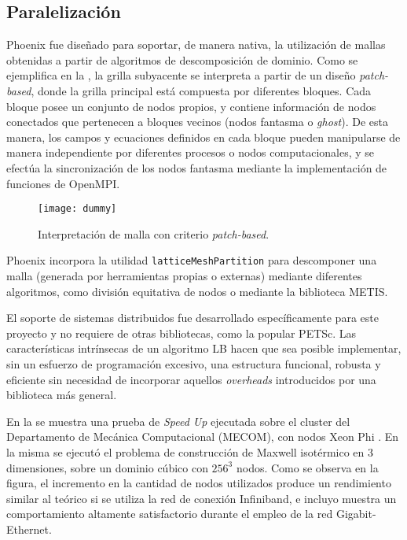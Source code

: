 \subsection{Paralelizaci\'on}

Phoenix fue dise\~nado para soportar, de manera nativa, la utilizaci\'on de mallas obtenidas a partir de algoritmos de descomposici\'on de dominio. Como se ejemplifica en la , la grilla subyacente se interpreta a partir de un dise\~no \emph{patch-based}, donde la grilla principal est\'a compuesta por diferentes bloques. Cada bloque posee un conjunto de nodos propios, y contiene informaci\'on de nodos conectados que pertenecen a bloques vecinos (nodos fantasma o \emph{ghost}). De esta manera, los campos y ecuaciones definidos en cada bloque pueden manipularse de manera independiente por diferentes procesos o nodos computacionales, y se efect\'ua la sincronizaci\'on de los nodos fantasma mediante la implementaci\'on de funciones de OpenMPI. 

\begin{figure}[ht]
	\centering
	\texttt{[image: dummy]}
	\caption{Interpretaci\'on de malla con criterio \emph{patch-based}.}
	\label{fig:patch_based}
\end{figure}

Phoenix incorpora la utilidad \texttt{latticeMeshPartition} para descomponer una malla (generada por herramientas propias o externas) mediante diferentes algoritmos, como divisi\'on equitativa de nodos o mediante la biblioteca METIS.

El soporte de sistemas distribuidos fue desarrollado espec\'ificamente para este proyecto y no requiere de otras bibliotecas, como la popular PETSc. Las caracter\'isticas intr\'insecas de un algoritmo LB hacen que sea posible implementar, sin un esfuerzo de programaci\'on excesivo, una estructura funcional, robusta y eficiente sin necesidad de incorporar aquellos \emph{overheads} introducidos por una biblioteca m\'as general. 

En la  se muestra una prueba de \emph{Speed Up} ejecutada sobre el cluster del Departamento de Mec\'anica Computacional (MECOM), con nodos Xeon Phi . En la misma se ejecut\'o el problema de construcci\'on de Maxwell isot\'ermico en 3 dimensiones, sobre un dominio c\'ubico con $256^3$ nodos. Como se observa en la figura, el incremento en la cantidad de nodos utilizados produce un rendimiento similar al te\'orico si se utiliza la red de conexi\'on Infiniband, e incluyo muestra un comportamiento altamente satisfactorio durante el empleo de la red Gigabit-Ethernet.

